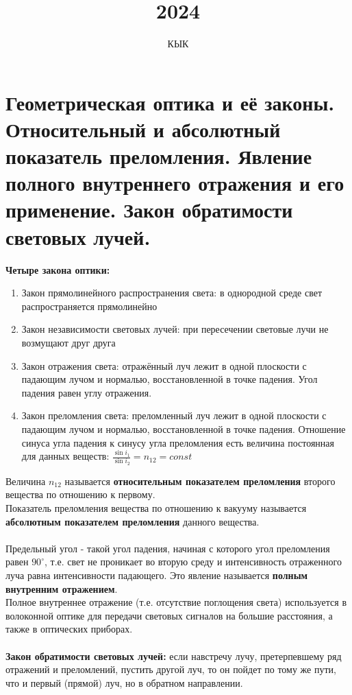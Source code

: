 \documentclass[14pt]{extarticle}
\title{2024}
\author{КЫК}
\begin{document}
\maketitle
\tableofcontents

\section{Геометрическая оптика и её законы. Относительный и абсолютный показатель
преломления. Явление полного внутреннего отражения и его применение. Закон
обратимости световых лучей.}

\textbf{Четыре закона оптики:}
\begin{enumerate}
    \item Закон прямолинейного распространения света: 
    в однородной среде свет распространяется прямолинейно 
    \item Закон независимости световых лучей: 
    при пересечении световые лучи не возмущают друг друга
    \item Закон отражения света:
    отражённый луч лежит в одной плоскости с падающим лучом и 
    нормалью, восстановленной в точке падения. Угол падения равен 
    углу отражения. 
    \item Закон преломления света:
    преломленный луч лежит в одной плоскости с падающим лучом и нормалью,
    восстановленной в точке падения. Отношение синуса угла падения к синусу
    угла преломления есть величина постоянная для данных веществ:
    $\frac{\sin i_1}{\sin i_2} = n_{12} = const$
\end{enumerate}
Величина $n_{12}$ называется \textbf{относительным показателем преломления} 
второго вещества по отношению к первому.\\
Показатель преломления вещества по отношению к вакууму называется 
\textbf{абсолютным показателем преломления} данного вещества.\\\\
Предельный угол - такой угол падения, начиная с которого угол преломления 
равен $90^\circ$, т.е. свет не проникает во вторую среду и интенсивность
отраженного луча равна интенсивности падающего. Это явление называется
\textbf{полным внутренним отражением}.\\
Полное внутреннее отражение (т.е. отсутствие поглощения света) 
используется в волоконной оптике для передачи световых сигналов на большие
расстояния, а также в оптических приборах.\\\\
\textbf{Закон обратимости световых лучей:} если навстречу лучу, 
претерпевшему ряд отражений и преломлений, пустить другой луч, то 
он пойдет по тому же пути, что и первый (прямой) луч, но в 
обратном направлении. 
\end{document}
